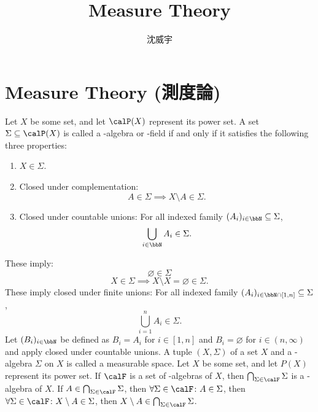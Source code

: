 \documentclass[a4paper,12pt]{article}
\begin{document}
\title{Measure Theory}
\author{沈威宇}
\date{\temtoday}
\titletocdoc
\section{Measure Theory (測度論)}
Let $X$ be some set, and let $\calP(X)$ represent its power set. A set $\Sigma \subseteq\calP(X)$ is called a \text{\textsigma}-algebra or \text{\textsigma}-field if and only if it satisfies the following three properties:
\begin{enumerate}
\item $X\in\Sigma$.
\item Closed under complementation:
\[A\in\Sigma\implies X\setminus A\in\Sigma.\]
\item Closed under countable unions: For all indexed family $(A_i)_{i\in\bbN}\subseteq\Sigma$,
\[\bigcup_{i\in\bbN}A_i\in\Sigma.\]
\end{enumerate}
These imply:
\[\varnothing\in\Sigma\]
\bpr
\[X\in\Sigma\implies X\setminus X=\varnothing\in\Sigma.\]
\epr
These imply closed under finite unions: For all indexed family $(A_i)_{i\in\bbN\cap[1,n]}\subseteq\Sigma$,
\[\bigcup_{i=1}^nA_i\in\Sigma.\]
\bpr
Let $(B_i)_{i\in\bbN}$ be defined as $B_i=A_i$ for $i\in[1,n]$ and $B_i=\varnothing$ for $i\in(n,\infty)$ and apply closed under countable unions.
\epr
{}
A tuple $(X,\Sigma)$ of a set $X$ and a \text{\textsigma}-algebra $\Sigma$ on $X$ is called a measurable space.
Let $X$ be some set, and let $P(X)$ represent its power set. If $\calF$ is a set of \text{\textsigma}-algebras of $X$, then $\bigcap_{\Sigma\in\calF}\Sigma$ is a \text{\textsigma}-algebra of $X$.
\bpr
If $A\in\bigcap_{\Sigma\in\calF}\Sigma$, then $\forall\Sigma\in\calF\colon A\in\Sigma$, then $\forall\Sigma\in\calF\colon X\setminus A\in\Sigma$, then $X\setminus A\in\bigcap_{\Sigma\in\calF}\Sigma$.
\end{document}
